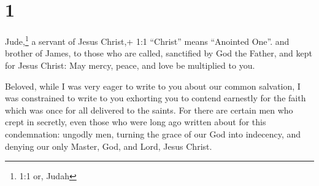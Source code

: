 \hypertarget{section}{%
\section{1}\label{section}}

 Jude,\footnote{1:1 or, Judah} a servant of Jesus Christ,+
1:1 ``Christ'' means ``Anointed One''. and brother of James, to those
who are called, sanctified by God the Father, and kept for Jesus Christ:
 May mercy, peace, and love be multiplied to you.

 Beloved, while I was very eager to write to you about our
common salvation, I was constrained to write to you exhorting you to
contend earnestly for the faith which was once for all delivered to the
saints.  For there are certain men who crept in secretly,
even those who were long ago written about for this condemnation:
ungodly men, turning the grace of our God into indecency, and denying
our only Master, God, and Lord, Jesus Christ.

